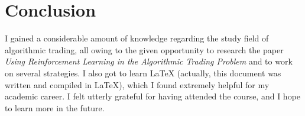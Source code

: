 \documentclass[12pt, letterpaper, oneside]{article}
\begin{document}
\section{Conclusion}
I gained a considerable amount of knowledge regarding the study field of algorithmic trading, all owing to the given opportunity to research the paper \textit{Using Reinforcement Learning in the Algorithmic Trading Problem} and to work on several strategies. I also got to learn \LaTeX{} (actually, this document was written and compiled in \LaTeX{}), which I found extremely helpful for my academic career. I felt utterly grateful for having attended the course, and I hope to learn more in the future.

\medskip



\end{document}

